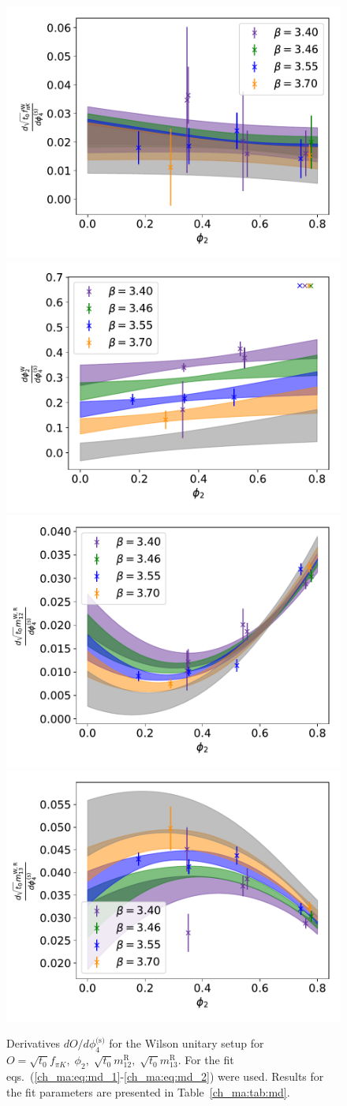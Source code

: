 \begin{figure}
    \centering
    \includegraphics[width=.49\textwidth]{./cap4/figs/dt0fpik_w.pdf}
    \includegraphics[width=.49\textwidth]{./cap4/figs/dphi2_w.pdf}
    \includegraphics[width=.49\textwidth]{./cap4/figs/dt0m12_w.pdf}
    \includegraphics[width=.49\textwidth]{./cap4/figs/dt0m13_w.pdf}
    \caption{Derivatives $dO/d\phi_4^{\textrm{(s)}}$ for the Wilson unitary setup for $O=\sqrt{t_0}f_{\pi K},\;\phi_2,\;\sqrt{t_0}m_{12}^{\textrm{R}},\;\sqrt{t_0}m_{13}^{\textrm{R}}$. For the fit eqs.~(\ref{ch_ma:eq:md_1}-\ref{ch_ma:eq:md_2}) were used. Results for the fit parameters are presented in Table~\ref{ch_ma:tab:md}.}
    \label{ch_ma:fig:d_w}
\end{figure}

